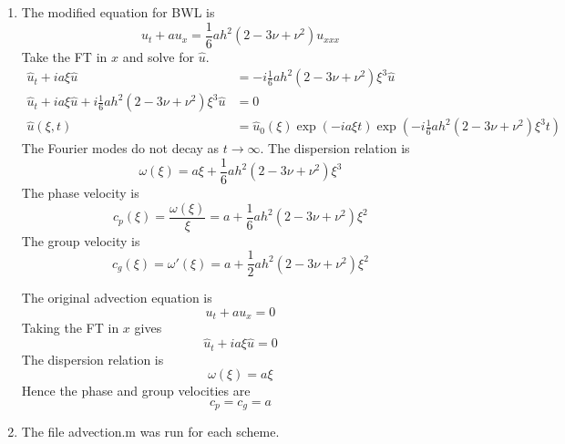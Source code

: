 \documentclass{article}
\begin{document}
\begin{enumerate}
\begin{enumerate}
\begin{enumerate}
		\item The modified equation for BWL is
		$$u_t + au_x = \frac16ah^2(2-3\nu+\nu^2)u_{xxx}$$
		Take the FT in $x$ and solve for $\hat u$.
		\begin{align*}
			\hat u_t + ia\xi\hat u &= -i\frac16ah^2(2-3\nu+\nu^2)\xi^3\hat u\\
			\hat u_t + ia\xi\hat u + i\frac16ah^2(2-3\nu+\nu^2)\xi^3\hat u &= 0\\
			\hat u(\xi,t) &= \hat u_0(\xi)\exp(-ia\xi t)\exp(-i\frac16ah^2(2-3\nu+\nu^2)\xi^3t)
		\end{align*}
		The Fourier modes do not decay as $t\to\infty$. The dispersion relation is
		$$\omega(\xi) = a\xi + \frac16ah^2(2-3\nu+\nu^2)\xi^3$$
		The phase velocity is
		$$c_p(\xi) = \frac{\omega(\xi)}{\xi} = a + \frac16ah^2(2-3\nu+\nu^2)\xi^2$$
		The group velocity is
		$$c_g(\xi) = \omega'(\xi) = a + \frac12ah^2(2-3\nu+\nu^2)\xi^2$$
		
		The original advection equation is
		$$u_t + au_x = 0$$
		Taking the FT in $x$ gives
		$$\hat u_t + ia\xi\hat u = 0$$
		The dispersion relation is
		$$\omega(\xi) = a\xi$$
		Hence the phase and group velocities are
		$$c_p = c_g = a$$
		
		
		\item The file advection.m was run for each scheme.
		

\end{enumerate}
\end{enumerate}
\end{enumerate}
\end{document}
